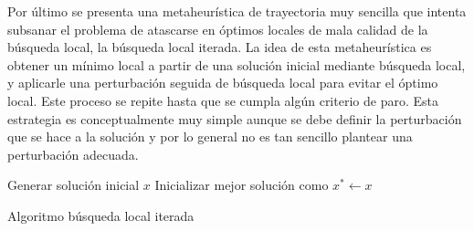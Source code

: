 \smallskip
Por último se presenta una metaheurística de trayectoria muy sencilla que intenta subsanar el problema de atascarse en óptimos locales de mala calidad de la búsqueda local,
la búsqueda local iterada.
%
La idea de esta metaheurística es obtener un mínimo local a partir de una solución inicial mediante búsqueda local, y aplicarle una perturbación seguida de búsqueda local para
evitar el óptimo local.
%
Este proceso se repite hasta que se cumpla algún criterio de paro. 
%
Esta estrategia es conceptualmente muy simple aunque se debe definir la perturbación que se hace a la solución y por lo general no es tan sencillo plantear una perturbación adecuada.\\

\begin{algorithm}[H]
 Generar solución inicial $x$\;
 Inicializar mejor solución como $x^*\leftarrow x$
    \label{alg:ILS}
    \caption{Algoritmo búsqueda local iterada}
\end{algorithm}
